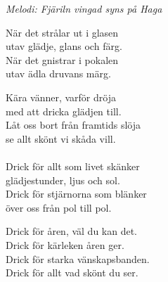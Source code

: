 {\footnotesize\textit{Melodi: Fjäriln vingad syns på Haga}}\par
\vspace{10pt}
När det strålar ut i glasen\\
utav glädje, glans och färg.\\
När det gnistrar i pokalen\\
utav ädla druvans märg.\par
\vspace{10pt}
Kära vänner, varför dröja\\
med att dricka glädjen till.\\
Låt oss bort från framtids slöja\\
se allt skönt vi skåda vill.\\
\\
Drick för allt som livet skänker\\
glädjestunder, ljus och sol.\\
Drick för stjärnorna som blänker\\
över oss från pol till pol.\par
\vspace{10pt}
Drick för åren, väl du kan det.\\
Drick för kärleken åren ger.\\
Drick för starka vänskapsbanden.\\
Drick för allt vad skönt du ser.
